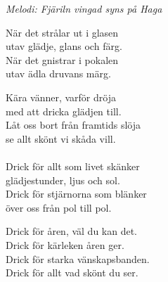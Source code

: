 {\footnotesize\textit{Melodi: Fjäriln vingad syns på Haga}}\par
\vspace{10pt}
När det strålar ut i glasen\\
utav glädje, glans och färg.\\
När det gnistrar i pokalen\\
utav ädla druvans märg.\par
\vspace{10pt}
Kära vänner, varför dröja\\
med att dricka glädjen till.\\
Låt oss bort från framtids slöja\\
se allt skönt vi skåda vill.\\
\\
Drick för allt som livet skänker\\
glädjestunder, ljus och sol.\\
Drick för stjärnorna som blänker\\
över oss från pol till pol.\par
\vspace{10pt}
Drick för åren, väl du kan det.\\
Drick för kärleken åren ger.\\
Drick för starka vänskapsbanden.\\
Drick för allt vad skönt du ser.
